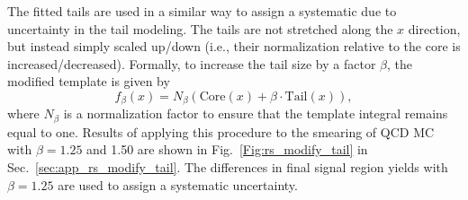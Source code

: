 The fitted tails are used in a similar way to assign a systematic due to uncertainty in the tail modeling.
The tails are not stretched along the $x$ direction, but instead simply scaled up/down (i.e., their normalization
relative to the core is increased/decreased). Formally, to increase the tail size by a factor $\beta$, the
modified template is given by
\[
   f_\beta(x) = N_\beta(\text{Core}(x) + \beta\cdot\text{Tail}(x)),
\]
where $N_\beta$ is a normalization factor to ensure that the template integral remains equal to one.
Results of applying this procedure to the smearing of QCD MC with $\beta=1.25$ and 1.50 
are shown in Fig.~\ref{Fig:rs_modify_tail} in Sec.~\ref{sec:app_rs_modify_tail}. 
The differences in final signal region yields with $\beta=1.25$ are used to assign a systematic uncertainty.
